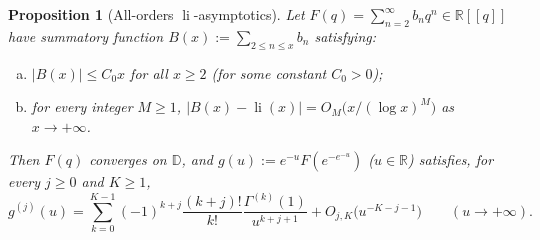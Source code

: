 \documentclass[10pt,reqno]{amsart}
\numberwithin{equation}{section}
\newtheorem{proposition}{Proposition}[section]
\theoremstyle{definition}
\newcommand{\R}{\mathbb{R}}
\newcommand{\D}{\mathbb{D}}
\DeclareMathOperator{\li}{li}
\begin{document}
\begin{proposition}[All-orders $\li$-asymptotics]\label{prop:li-asymp}
Let $F(q) = \sum_{n=2}^\infty b_n q^n \in \R[[q]]$ have summatory function $B(x) := \sum_{2 \le n \le x} b_n$ satisfying:
\begin{enumerate}[(a)]
  \item $|B(x)| \le C_0 x$ for all $x \ge 2$ (for some constant $C_0 > 0$);
  \item for every integer $M \ge 1$, $|B(x) - \li(x)| = O_M\bigl(x / (\log x)^M\bigr)$ as $x \to +\infty$.
\end{enumerate}
Then $F(q)$ converges on $\D$, and $g(u) := e^{-u} F(e^{-e^{-u}})$ ($u \in \R$) satisfies, for every $j \ge 0$ and $K \ge 1$,
\begin{equation}\label{eq:li-asymp}
  g^{(j)}(u) = \sum_{k=0}^{K-1} (-1)^{k+j} \frac{(k+j)!}{k!} \frac{\Gamma^{(k)}(1)}{u^{k+j+1}} + O_{j,K}\bigl(u^{-K-j-1}\bigr)
  \qquad (u \to +\infty).
\end{equation}
\end{proposition}
\end{document}
